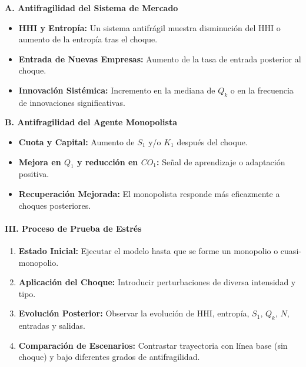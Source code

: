\documentclass[a4paper,12pt]{article}
\begin{document}
\textbf{A. Antifragilidad del Sistema de Mercado}

\begin{itemize}
    \item \textbf{HHI y Entropía:} Un sistema antifrágil muestra disminución del HHI o aumento de la entropía tras el choque.
    
    \item \textbf{Entrada de Nuevas Empresas:} Aumento de la tasa de entrada posterior al choque.
    
    \item \textbf{Innovación Sistémica:} Incremento en la mediana de $Q_k$ o en la frecuencia de innovaciones significativas.
\end{itemize}

\textbf{B. Antifragilidad del Agente Monopolista}

\begin{itemize}
    \item \textbf{Cuota y Capital:} Aumento de $S_1$ y/o $K_1$ después del choque.
    
    \item \textbf{Mejora en $Q_1$ y reducción en $CO_1$:} Señal de aprendizaje o adaptación positiva.
    
    \item \textbf{Recuperación Mejorada:} El monopolista responde más eficazmente a choques posteriores.
\end{itemize}

\paragraph{III. Proceso de Prueba de Estrés}

\begin{enumerate}
    \item \textbf{Estado Inicial:} Ejecutar el modelo hasta que se forme un monopolio o cuasi-monopolio.
    
    \item \textbf{Aplicación del Choque:} Introducir perturbaciones de diversa intensidad y tipo.
    
    \item \textbf{Evolución Posterior:} Observar la evolución de HHI, entropía, $S_1$, $Q_k$, $N$, entradas y salidas.
    
    \item \textbf{Comparación de Escenarios:} Contrastar trayectoria con línea base (sin choque) y bajo diferentes grados de antifragilidad.
\end{enumerate}
\end{document}
